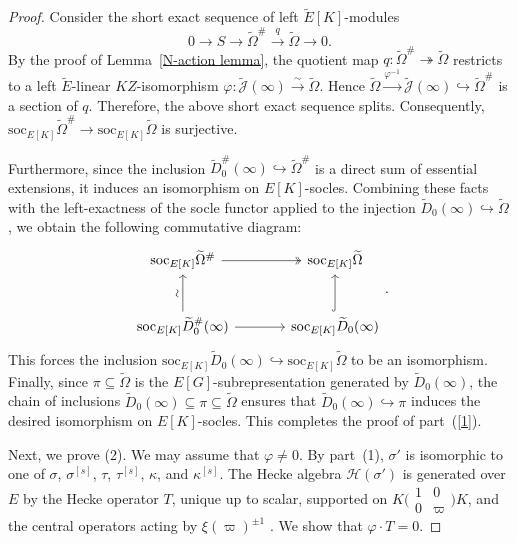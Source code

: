 \documentclass[a4paper,10pt,twoside]{amsart}
\theoremstyle{definition}
\numberwithin{equation}{section}
\begin{document}
\begin{proof}
Consider the short exact sequence of left \(\widetilde E[K]\)-modules
\[
0\longrightarrow S
\longrightarrow \widetilde\Omega^\#
\xrightarrow{q}
\widetilde\Omega
\longrightarrow 0.
\]
By the proof of Lemma~\ref{N-action lemma}, the quotient map
\(q:\widetilde\Omega^\#\twoheadrightarrow\widetilde\Omega\)
restricts to a left \(\widetilde E\)-linear \(KZ\)-isomorphism
\(
\varphi:
\widetilde{\mathcal J}(\infty)
\xrightarrow{\sim}
\widetilde\Omega.
\) Hence
\(
\widetilde\Omega
\xrightarrow{\varphi^{-1}}
\widetilde{\mathcal J}(\infty)
\hookrightarrow
\widetilde\Omega^\#
\) is a section of \(q\). Therefore, the above short exact sequence splits. Consequently, $\mathrm{soc}_{E[K]}\widetilde{\Omega}^\# \rightarrow \mathrm{soc}_{E[K]}\widetilde{\Omega}$ is surjective.

Furthermore, since the inclusion $\widetilde{D}_0^\#(\infty) \hookrightarrow \widetilde{\Omega}^\#$ is a direct sum of essential extensions, it induces an isomorphism on $E[K]$-socles. Combining these facts with the left-exactness of the socle functor applied to the injection $\widetilde{D}_0(\infty) \hookrightarrow \widetilde{\Omega}$, we obtain the following commutative diagram:
\[
\begin{tikzcd}[row sep=large, column sep=large]
\mathrm{soc}_{E[K]}\widetilde{\Omega}^\# \arrow[r, two heads] & \mathrm{soc}_{E[K]}\widetilde{\Omega} \\
\mathrm{soc}_{E[K]}\widetilde{D}_0^\#(\infty) \arrow[u, "\sim" sloped] \arrow[r] & \mathrm{soc}_{E[K]}\widetilde{D}_0(\infty) \arrow[u, hook]
\end{tikzcd}.
\]
This forces the inclusion $\mathrm{soc}_{E[K]}\widetilde{D}_0(\infty) \hookrightarrow \mathrm{soc}_{E[K]}\widetilde{\Omega}$ to be an isomorphism. Finally, since $\pi \subseteq \widetilde{\Omega}$ is the $E[G]$-subrepresentation generated by $\widetilde{D}_0(\infty)$, the chain of inclusions $\widetilde{D}_0(\infty) \subseteq \pi \subseteq \widetilde{\Omega}$ ensures that $\widetilde{D}_0(\infty) \hookrightarrow \pi$ induces the desired isomorphism on $E[K]$-socles. This completes the proof of part~(\ref{1}).

Next, we prove \textup{(2)}. We may assume that \(\varphi\neq0\).
By part~\textup{(1)}, \(\sigma'\) is isomorphic to one of
\(\sigma\), \(\sigma^{[s]}\), \(\tau\), \(\tau^{[s]}\), \(\kappa\), and \(\kappa^{[s]}\).
The Hecke algebra \(\mathcal H(\sigma')\) is generated over \(E\)
by the Hecke operator \(T\), unique up to scalar, supported on
\(K\bigl(\begin{smallmatrix}1&0\\0&\varpi\end{smallmatrix}\bigr)K\),
and the central operators acting by
\(\xi(\varpi)^{\pm1}\) \cite{Her11b}.
We show that \(\varphi\cdot T=0\).


\end{proof}
\end{document}
